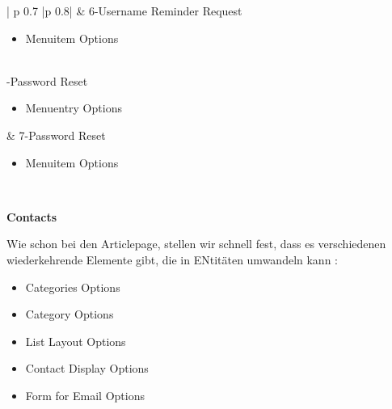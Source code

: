 \begin{minipage}{0.7\textwidth}
\begin{longtable}{| p {0.7\textwidth} |p {0.8\textwidth}|}
&
6-Username Reminder Request
\begin{itemize}
\item Menuitem Options
\end{itemize}
\\ -Password Reset
\begin{itemize}
\item Menuentry Options
\end{itemize}
&
7-Password Reset
\begin{itemize}
\item Menuitem Options
\end{itemize}
\\ \hline
\end{longtable}
\end{minipage}



\textbf{Contacts}

Wie schon bei den Articlepage, stellen wir schnell fest, dass es verschiedenen wiederkehrende Elemente gibt, die in ENtitäten umwandeln kann :
\begin{itemize}
\item Categories Options
\item Category Options
\item List Layout Options
\item Contact Display Options
\item Form for Email Options
\end{itemize}

